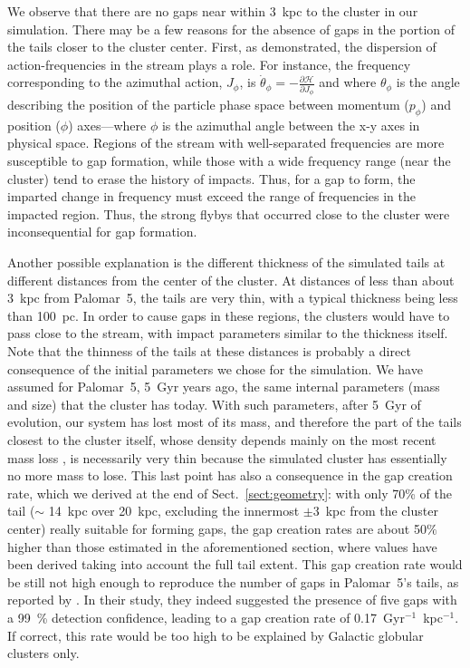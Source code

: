\documentclass{aa}
\begin{document}
    We observe that there are no gaps near within 3~kpc to the cluster in our simulation. There may be a few reasons for the absence of gaps in the portion of the tails closer to the cluster center. First, as \citet{2016MNRAS.457.3817S} demonstrated, the dispersion of action-frequencies in the stream plays a role. For instance, the frequency corresponding to the azimuthal action, $J_\phi$, is $\dot\theta_\phi = - \frac{\mathcal{\partial H}}{\partial J_\phi}$ and where $\theta_\phi$ is the angle describing the position of the particle phase space between momentum ($p_\phi$) and position ($\phi$) axes---where $\phi$ is the azimuthal angle between the x-y axes in physical space. Regions of the stream with well-separated frequencies are more susceptible to gap formation, while those with a wide frequency range (near the cluster) tend to erase the history of impacts. Thus, for a gap to form, the imparted change in frequency must exceed the range of frequencies in the impacted region. Thus, the strong flybys that occurred close to the cluster were inconsequential for gap formation. 
    
    Another possible explanation is the different thickness of the simulated tails at different distances from the center of the cluster. At distances of less than about 3~kpc from Palomar~5, the tails are very thin, with a typical thickness being less than 100~pc. In order to cause gaps in these regions, the clusters would have to pass close to the stream, with impact parameters similar to the thickness itself. Note that the thinness of the tails at these distances is probably a direct consequence of the initial parameters we chose for the simulation. We have assumed for Palomar~5, 5~Gyr years ago, the same internal parameters (mass and size) that the cluster has today. With such parameters, after 5~Gyr of evolution, our system has lost most of its mass, and therefore the part of the tails closest to the cluster itself, whose density depends mainly on the most recent mass loss \citep[see, for example, Fig.~A.3 in][]{2012A&A...546L...7M}, is necessarily very thin because the simulated cluster has essentially no more mass to lose. This last point has also a consequence in the gap creation rate, which we derived at the end of Sect.~\ref{sect:geometry}: with only 70\% of the tail  ($\sim$ 14~kpc over 20~kpc, excluding the innermost $\pm 3$~kpc from the cluster center) really suitable for forming gaps, the gap creation rates are about 50$\%$ higher than those estimated in the aforementioned section, where values have been derived taking into account the full tail extent. This gap creation rate would be still not high enough to reproduce the  number of gaps in Palomar~5's tails, as reported by \citet{2012ApJ...760...75C}. In their study, they indeed suggested the presence of  five gaps with a 99~\% detection confidence, leading to a gap creation rate of 0.17~Gyr$^{-1}$~kpc$^{-1}$. If correct, this rate would be too high to be explained by Galactic globular clusters only. 
\end{document}
